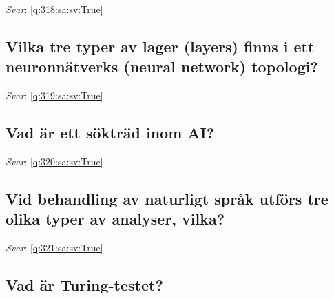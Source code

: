 \documentclass[a4paper,11pt,oneside]{article}
\begin{document}
\begin{sloppypar}
\noindent\makebox[\textwidth]{\hrulefill}

\vspace{1cm}

\textit{Svar}: \autoref{q:318:sa:sv:True}



\subsection{Vilka tre typer av lager (layers) finns i ett neuronn\"atverks (neural network) topologi?}

\label{q:319:sa:sv:False}

\vspace{2cm}

\noindent\makebox[\textwidth]{\hrulefill}

\vspace{1cm}

\textit{Svar}: \autoref{q:319:sa:sv:True}



\subsection{Vad \"ar ett s\"oktr\"ad inom AI?}

\label{q:320:sa:sv:False}

\vspace{2cm}

\noindent\makebox[\textwidth]{\hrulefill}

\vspace{1cm}

\textit{Svar}: \autoref{q:320:sa:sv:True}



\subsection{Vid behandling av naturligt spr\r{a}k utf\"ors tre olika typer av analyser, vilka?}

\label{q:321:sa:sv:False}

\vspace{2cm}

\noindent\makebox[\textwidth]{\hrulefill}

\vspace{1cm}

\textit{Svar}: \autoref{q:321:sa:sv:True}



\subsection{Vad \"ar Turing-testet?}


\end{sloppypar}
\end{document}
